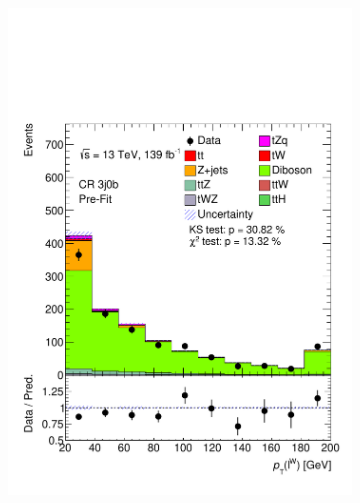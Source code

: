 \begin{figure}[h!]
\begin{subfigure}[b]{0.33\linewidth}
    \includegraphics[width=\linewidth]{ubonn-thesis/Chapters/Chapters_05/Figure/CR_VV/CR_3j0b_lepW_pt.pdf} 
  \end{subfigure}%
  \begin{subfigure}[b]{0.33\linewidth}
    \centering

\end{subfigure}
\end{figure}
